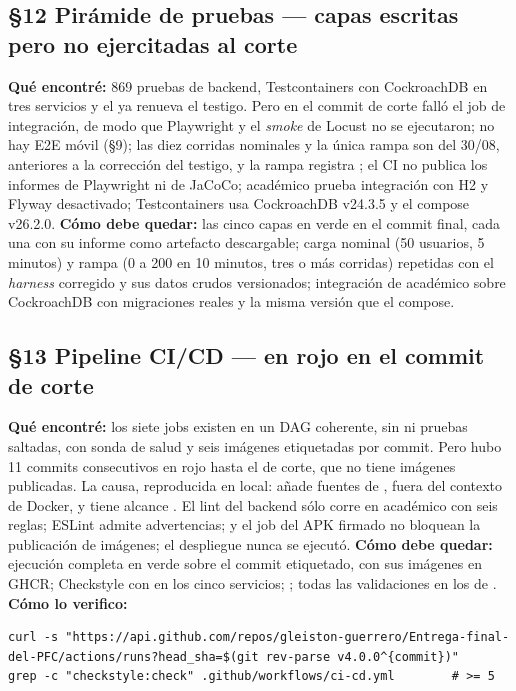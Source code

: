\subsection*{\S12 Pir\'amide de pruebas --- capas escritas pero no ejercitadas al corte}
\textbf{Qu\'e encontr\'e:} 869 pruebas de backend, Testcontainers con CockroachDB en tres servicios y el  ya renueva el testigo. Pero en el commit de corte fall\'o el job de integraci\'on, de modo que Playwright y el \emph{smoke} de Locust no se ejecutaron; no hay E2E m\'ovil (\S9); las diez corridas nominales y la \'unica rampa son del 30/08, anteriores a la correcci\'on del testigo, y la rampa registra ; el CI no publica los informes de Playwright ni de JaCoCo; acad\'emico prueba integraci\'on con H2 y Flyway desactivado; Testcontainers usa CockroachDB v24.3.5 y el compose v26.2.0. \textbf{C\'omo debe quedar:} las cinco capas en verde en el commit final, cada una con su informe como artefacto descargable; carga nominal (50 usuarios, 5 minutos) y rampa (0 a 200 en 10 minutos, tres o m\'as corridas) repetidas con el \emph{harness} corregido y sus datos crudos versionados; integraci\'on de acad\'emico sobre CockroachDB con migraciones reales y la misma versi\'on que el compose.

\subsection*{\S13 Pipeline CI/CD --- en rojo en el commit de corte}
\textbf{Qu\'e encontr\'e:} los siete jobs existen en un DAG coherente, sin  ni pruebas saltadas, con sonda de salud y seis im\'agenes etiquetadas por commit. Pero hubo 11 commits consecutivos en rojo hasta el de corte, que no tiene im\'agenes publicadas. La causa, reproducida en local:  a\~nade fuentes de , fuera del contexto de Docker, y  tiene alcance . El lint del backend s\'olo corre en acad\'emico con seis reglas; ESLint admite advertencias;  y el job del APK firmado no bloquean la publicaci\'on de im\'agenes; el despliegue nunca se ejecut\'o. \textbf{C\'omo debe quedar:} ejecuci\'on completa en verde sobre el commit etiquetado, con sus im\'agenes en GHCR; Checkstyle con  en los cinco servicios; ; todas las validaciones en los  de . \textbf{C\'omo lo verifico:}\begin{verbatim}
curl -s "https://api.github.com/repos/gleiston-guerrero/Entrega-final-del-PFC/actions/runs?head_sha=$(git rev-parse v4.0.0^{commit})"
grep -c "checkstyle:check" .github/workflows/ci-cd.yml        # >= 5
\end{verbatim}

